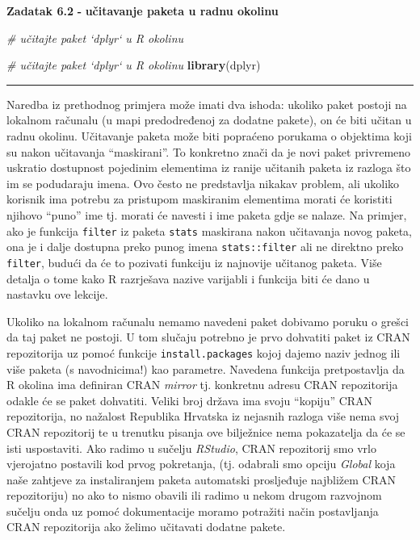 \documentclass[]{book}
\newenvironment{Shaded}{\begin{snugshade}}{\end{snugshade}}
\newcommand{\KeywordTok}[1]{\textcolor[rgb]{0.13,0.29,0.53}{\textbf{#1}}}
\newcommand{\CommentTok}[1]{\textcolor[rgb]{0.56,0.35,0.01}{\textit{#1}}}
\newcommand{\NormalTok}[1]{#1}
\theoremstyle{definition}
\theoremstyle{definition}
\theoremstyle{definition}
\theoremstyle{remark}
\begin{document}
\textbf{Zadatak 6.2} \textbf{-} \textbf{učitavanje paketa u radnu
okolinu}

\begin{Shaded}
\begin{Highlighting}[]
\CommentTok{# učitajte paket `dplyr` u R okolinu }
\end{Highlighting}
\end{Shaded}

\begin{Shaded}
\begin{Highlighting}[]
\CommentTok{# učitajte paket `dplyr` u R okolinu }
\KeywordTok{library}\NormalTok{(dplyr)}
\end{Highlighting}
\end{Shaded}

\begin{center}\rule{0.5\linewidth}{\linethickness}\end{center}

Naredba iz prethodnog primjera može imati dva ishoda: ukoliko paket
postoji na lokalnom računalu (u mapi predodređenoj za dodatne pakete),
on će biti učitan u radnu okolinu. Učitavanje paketa može biti popraćeno
porukama o objektima koji su nakon učitavanja ``maskirani''. To
konkretno znači da je novi paket privremeno uskratio dostupnost
pojedinim elementima iz ranije učitanih paketa iz razloga što im se
podudaraju imena. Ovo često ne predstavlja nikakav problem, ali ukoliko
korisnik ima potrebu za pristupom maskiranim elementima morati će
koristiti njihovo ``puno'' ime tj. morati će navesti i ime paketa gdje
se nalaze. Na primjer, ako je funkcija \texttt{filter} iz paketa
\texttt{stats} maskirana nakon učitavanja novog paketa, ona je i dalje
dostupna preko punog imena \texttt{stats::filter} ali ne direktno preko
\texttt{filter}, budući da će to pozivati funkciju iz najnovije učitanog
paketa. Više detalja o tome kako R razrješava nazive varijabli i
funkcija biti će dano u nastavku ove lekcije.

Ukoliko na lokalnom računalu nemamo navedeni paket dobivamo poruku o
grešci da taj paket ne postoji. U tom slučaju potrebno je prvo dohvatiti
paket iz CRAN repozitorija uz pomoć funkcije \texttt{install.packages}
kojoj dajemo naziv jednog ili više paketa (s navodnicima!) kao
parametre. Navedena funkcija pretpostavlja da R okolina ima definiran
CRAN \emph{mirror} tj. konkretnu adresu CRAN repozitorija odakle će se
paket dohvatiti. Veliki broj država ima svoju ``kopiju'' CRAN
repozitorija, no nažalost Republika Hrvatska iz nejasnih razloga više
nema svoj CRAN repozitorij te u trenutku pisanja ove bilježnice nema
pokazatelja da će se isti uspostaviti. Ako radimo u sučelju
\emph{RStudio}, CRAN repozitorij smo vrlo vjerojatno postavili kod prvog
pokretanja, (tj. odabrali smo opciju \emph{Global} koja naše zahtjeve za
instaliranjem paketa automatski prosljeđuje najbližem CRAN repozitoriju)
no ako to nismo obavili ili radimo u nekom drugom razvojnom sučelju onda
uz pomoć dokumentacije moramo potražiti način postavljanja CRAN
repozitorija ako želimo učitavati dodatne pakete.
\end{document}

